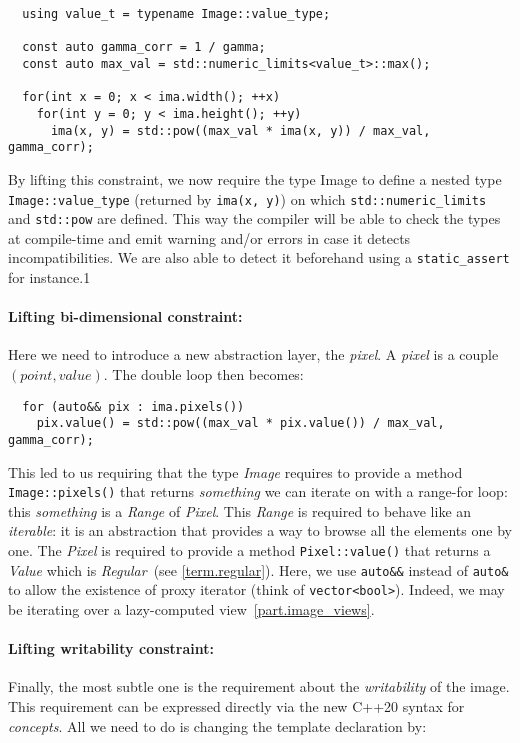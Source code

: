 \begin{verbatim}
  using value_t = typename Image::value_type;

  const auto gamma_corr = 1 / gamma;
  const auto max_val = std::numeric_limits<value_t>::max();

  for(int x = 0; x < ima.width(); ++x)
    for(int y = 0; y < ima.height(); ++y)
      ima(x, y) = std::pow((max_val * ima(x, y)) / max_val, gamma_corr);
\end{verbatim}

\noindent By lifting this constraint, we now require the type Image to define a nested type \texttt{Image::value\_type}
(returned by \texttt{ima(x, y)}) on which \texttt{std::numeric\_limits} and \texttt{std::pow} are defined. This way the
compiler will be able to check the types at compile-time and emit warning and/or errors in case it detects
incompatibilities. We are also able to detect it beforehand using a \texttt{static\_assert} for instance.1



\paragraph{Lifting bi-dimensional constraint:}
Here we need to introduce a new abstraction layer, the \emph{pixel}. A \emph{pixel} is a couple $(point, value)$. The
double loop then becomes:

\begin{verbatim}
  for (auto&& pix : ima.pixels())
    pix.value() = std::pow((max_val * pix.value()) / max_val, gamma_corr);
\end{verbatim}

\noindent This led to us requiring that the type \emph{Image} requires to provide a method \texttt{Image::pixels()} that
returns \emph{something} we can iterate on with a range-for loop: this \emph{something} is a \emph{Range} of
\emph{Pixel}. This \emph{Range} is required to behave like an \emph{iterable}: it is an abstraction that provides a way
to browse all the elements one by one. The \emph{Pixel} is required to provide a method \texttt{Pixel::value()} that
returns a \emph{Value} which is \emph{Regular}~(see \cref{term.regular}). Here, we use \texttt{auto\&\&} instead of
\texttt{auto\&} to allow the existence of proxy iterator (think of \texttt{vector<bool>}). Indeed, we may be iterating
over a lazy-computed view~\ref{part.image_views}.



\paragraph{Lifting writability constraint:}
Finally, the most subtle one is the requirement about the \emph{writability} of the image. This requirement can be
expressed directly via the new C++20 syntax for \emph{concepts}. All we need to do is changing the template declaration
by:

